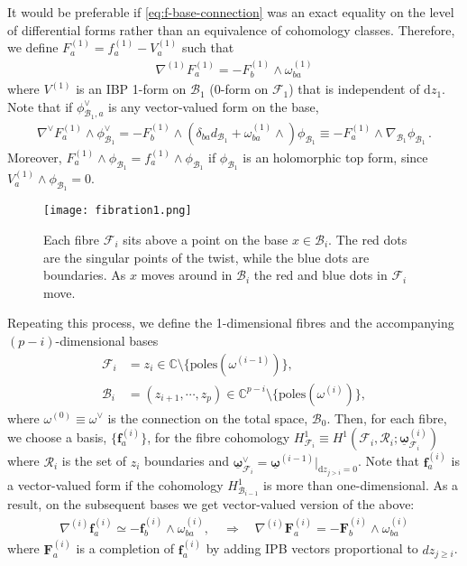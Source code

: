 \documentclass[11pt]{article}
\renewcommand{\d}{\text{d}}
\newcommand{\F}{\mathcal{F}}
\newcommand{\B}{\mathcal{B}}
\newcommand{\bs}[1]{\boldsymbol{#1}}
\newcommand{\mat}[1]{\underline{\boldsymbol{#1}}}
\begin{document}
It would be preferable if \eqref{eq:f-base-connection} was an exact equality on the level of differential forms rather than an equivalence of cohomology classes. Therefore, we define $F^{(1)}_a = f^{(1)}_a - V^{(1)}_a$ such that 
\begin{align}
	\label{eq:F-base-connection}
	\nabla^{(1)} F^{(1)}_a = - F^{(1)}_b \wedge \omega^{(1)}_{ba}
\end{align}
where $V^{(1)}$ is an IBP 1-form on $\B_1$ (0-form on $\F_1$) that is independent of $\d z_1$. Note that if $\phi^\vee_{\B_1,a}$ is any vector-valued form on the base, 
\begin{align}
	\label{eq:dF}
	\nabla^\vee F^{(1)}_a \wedge \phi^\vee_{\B_1} 
	= - F_b^{(1)} \wedge (\delta_{ba} d_{\B_1} + \omega^{(1)}_{ba} \wedge ) \phi_{\B_1}
	\equiv - F_a^{(1)} \wedge \nabla_{\B_1} \phi_{\B_1} \,.
\end{align}
Moreover, $F^{(1)}_a \wedge \phi_{\B_1} = f^{(1)}_a \wedge \phi_{\B_1}$ if $\phi_{\B_1}$ is an holomorphic top form, since
$V_a^{(1)} \wedge \phi_{\B_1} = 0$.

\begin{figure}
	\centering
	\texttt{[image: fibration1.png]}
	\caption{
	Each fibre $\F_i$ sits above a point on the base $x \in \B_i$. 
	The red dots are the singular points of the twist, while the blue dots are boundaries. 
	As $x$ moves around in $\B_i$ the red and blue dots in $\F_i$ move.
	}
\end{figure}

Repeating this process, we define the 1-dimensional fibres and the accompanying $(p-i)$-dimensional bases
\begin{align}
	\F_i &= z_i \in \mathbb{C} \setminus \{\text{poles}(\omega^{(i-1)})\} ,
	\\
	\B_i &= (z_{i+1},\cdots,z_p)\in \mathbb{C}^{p-i} \setminus \{\text{poles}(\omega^{(i)})\},
\end{align}
where $\omega^{(0)} \equiv \omega^\vee$ is the connection on the total space, $\B_0$. Then, for each fibre, we choose a basis, $\{\bs{f}^{(i)}_a\}$, for the fibre cohomology $H_{\F_i}^1 \equiv H^1(\F_i,\mathcal{R}_i; \mat{\omega}^{(i)}_{\F_i})$ where $\mathcal{R}_i$ is the set of $z_i$ boundaries and $\mat{\omega}_{\F_i}^\vee = \mat{\omega}^{(i-1)}\vert_{\d z_{j>i}=0}$. Note that $\bs{f}^{(i)}_a$ is a vector-valued form if the cohomology $H^1_{\B_{i-1}}$ is more than one-dimensional.
As a result, on the subsequent bases we get vector-valued version of the above:
\begin{align}
	\nabla^{(i)} \bs{f}^{(i)}_a  \simeq - \bs{f}^{(i)}_b \wedge \omega^{(i)}_{ba},\quad\Rightarrow\quad
	\nabla^{(i)} \bs{F}^{(i)}_a  = - \bs{F}^{(i)}_b \wedge \omega^{(i)}_{ba} \label{eq:nabla_commutation}
\end{align}
where $\bs{F}^{(i)}_a$ is a completion of $\bs{f}^{(i)}_a$ by adding IPB vectors proportional to $dz_{j\geq i}$.
\end{document}

